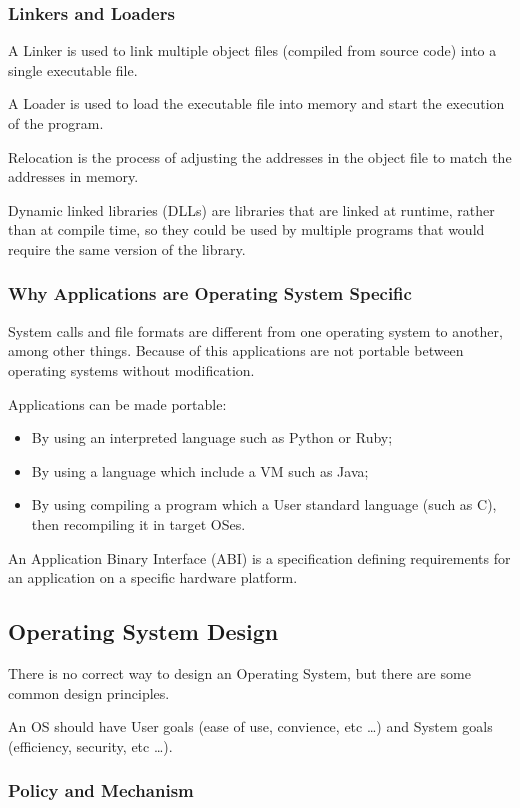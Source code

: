 \documentclass[]{article}
\begin{document}
\subsubsection*{Linkers and Loaders}

A Linker is used to link multiple object files (compiled from source code) into a single executable file.

A Loader is used to load the executable file into memory and start the execution of the program.

Relocation is the process of adjusting the addresses in the object file to match the addresses in memory.

Dynamic linked libraries (DLLs) are libraries that are linked at runtime, rather than at compile time, so they could be used by multiple programs that would require the same version of the library.

\subsubsection*{Why Applications are Operating System Specific}
System calls and file formats are different from one operating system to another, among other things. Because of this applications are not portable between operating systems without modification.

Applications can be made portable:
\begin{itemize}
    \item By using an interpreted language such as Python or Ruby;
    \item By using a language which include a VM such as Java;
    \item By using compiling a program which a User standard language (such as C), then recompiling it in target OSes.
\end{itemize}

An Application Binary Interface (ABI) is a specification defining requirements for an application on a specific hardware platform.

\subsection{Operating System Design}
There is no correct way to design an Operating System, but there are some common design principles.

An OS should have User goals (ease of use, convience, etc \dots) and System goals (efficiency, security, etc \dots).

\subsubsection*{Policy and Mechanism}
\end{document}
